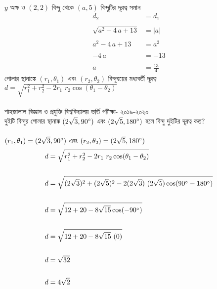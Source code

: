 \documentclass{article}
\begin{document}
\\ 
$y$ অক্ষ ও $(2,2)$ বিন্দু থেকে $(a,5)$ বিন্দুটির দূরত্ব সমান \\ 
\begin{align*}
	d_2&=d_1\\
	\\
	\sqrt{a^2-4\,a+13}&=|a|\\
	\\
	a^2-4\,a+13&=a^2\\
	\\
	-4\, a&=-13\\
	\\
	a&=\frac{13}{4}
\end{align*}
পোলার স্থানাঙ্কে  $(r_1,\theta_1)$ এবং  $(r_2,\theta_2)$ বিন্দুদ্বয়ের মধ্যবর্তী দূরত্ব  $d=\sqrt{r_1^2+r_2^2-2r_1\,\,r_2 \cos (\theta_1-\theta_2)}$\\
\\ 
শাহজালাল বিজ্ঞান ও প্রযুক্তি বিশ্ববিদ্যালয় ভর্তি পরীক্ষা- ২০১৯-২০২০\\
দুইটি বিন্দুর পোলার স্থানাঙ্ক $(2\sqrt{3},90\degree)$ এবং $(2\sqrt{5},180\degree)$ হলে  বিন্দু দুইটির দূরত্ব কত? \\ 
\\ 
$(r_1,\theta_1)=(2\sqrt{3},90\degree)$ এবং  $(r_2,\theta_2)=(2\sqrt{5},180\degree)$
\\
\begin{align*}
d&=\sqrt{r_1^2+r_2^2-2r_1\,\,r_2 \cos (\theta_1-\theta_2)}\\
\\
d&=\sqrt{(2\sqrt{3})^2+(2\sqrt{5})^2-2(2\sqrt{3})\,\,(2\sqrt{5})\cos (90\degree-180\degree)}\\
\\
d&=\sqrt{12+20-8\sqrt{15}\cos (-90\degree)}\\
\\
d&=\sqrt{12+20-8\sqrt{15}\,\,(0)}\\
\\
d&=\sqrt{32}\\
\\
d&=4\sqrt{2}
\end{align*}
\end{document}
